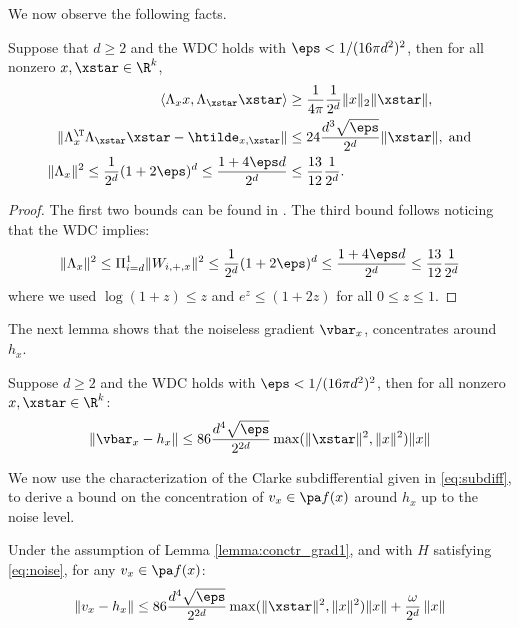 We now observe the following facts.
\begin{lemma}\label{lemma:conctrWDC}
	Suppose that $d\geq 2$ and the WDC holds with $\eps < 1/(16 \pi d^2)^2$, then for all nonzero $x, \xstar \in \R^k$,
	\begin{align}
	\langle\Lambda_x x, \Lambda_\xstar \xstar \rangle &\geq \frac{1}{4 \pi} \frac{1}{2^d} \|x\|_2 \|\xstar\|, \label{eq:LxLy}\\
	\| \Lambda_x^\T \Lambda_\xstar \xstar - \htilde_{x,\xstar} \| &\leq 24 \frac{d^3 \sqrt{\eps}}{2^d} \|\xstar\|,  \; \text{and} \label{eq:htilde_conctr} \\
	\|\Lambda_x\|^2 \leq \frac{1}{2^d} (1 + 2 \eps)^d\leq \frac{1+ 4 \eps d}{2^d}  &\leq \frac{13}{12} \frac{1}{2^d} \label{eq:Lx_bound}. 
	\end{align}
\end{lemma}
\begin{proof}
	The first two bounds can be found in \citep[Lemma 8]{HV17}. The third bound follows noticing that the WDC implies:
	\[
	\|\Lambda_x \|^2 \leq \Pi_{i=d}^1 \| W_{i,+,x} \|^2 \leq \frac{1}{2^d} (1 + 2 \eps)^d \leq \frac{1 + 4 \eps d}{2^d} \leq \frac{13}{12}\frac{1}{2^d}
	\]
	where we used $\log(1+z) \leq z$ and $e^{z}\leq (1 + 2 z)$ for all $0\leq z \leq 1$.
\end{proof}

The next lemma shows that the noiseless gradient $\vbar_x$, concentrates around $h_x$.
\begin{lemma}\label{lemma:conctr_grad1}
	Suppose $d\geq 2$ and the WDC holds with $\eps < 1/(16 \pi d^2)^2$, then for all nonzero $x, \xstar \in \R^k$:
	\[
	\|\vbar_x - h_x \| \leq 86 \frac{ d^4 \sqrt{\eps}}{2^{2d}} \max(\|\xstar\|^2, \| x\|^2) \|x\|
	\]
\end{lemma}


We now use the characterization of the Clarke subdifferential given in \eqref{eq:subdiff}, to derive a bound on the concentration of $v_x \in \pa f(x)$ around $h_x$ up to the noise level.
\begin{lemma}\label{lemma:conctr_grad2}
	Under the assumption of Lemma \ref{lemma:conctr_grad1}, and with $H$ satisfying \eqref{eq:noise}, for any $v_x \in \pa f(x)$:
	\[
	\|v_x - h_x \| \leq 86 \frac{ d^4 \sqrt{\eps}}{2^{2d}} \max(\|\xstar\|^2, \| x\|^2) \|x\| +   \frac{\omega}{2^{d}} \,  \| x\|
	\]
\end{lemma}